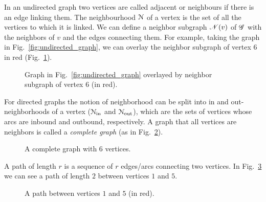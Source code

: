 \documentclass[../main.tex]{subfiles}
\begin{document}
In an undirected graph two vertices are called adjacent or neighbours if there is an edge linking them.
The neighbourhood $\mathcal{N}$ of a vertex is the set of all the vertices to which it is linked.
We can define a neighbor subgraph $\mathscr{N}(v)$ of $\mathscr{G}$ with the neighbors of $v$ and the edges connecting them. For example, taking the graph in Fig.~\ref{fig:undirected_graph}, we can overlay the neighbor subgraph of vertex $6$ in red (Fig.~\ref{fig:neighbor_subgraph}).


\begin{figure}[h]
  \centering
  \caption[Neighbor subgraph of vertex $6$ (in red).]{Graph in Fig.~\ref{fig:undirected_graph} overlayed by neighbor subgraph of vertex $6$ (in red).}\label{fig:neighbor_subgraph}
\end{figure}

For directed graphs the notion of neighborhood can be split into in and out-neighborhoods of a vertex ($\mathcal{N}_{\text{in}}$ and $\mathcal{N}_{\text{out}}$), which are the sets of vertices whose arcs are inbound and outbound, respectively.
A graph that all vertices are neighbors is called a \emph{complete graph} (as in Fig.~\ref{fig:complete_graph}).

\begin{figure}[h]
    \centering
    \caption{A complete graph with 6 vertices.}\label{fig:complete_graph}
\end{figure}

A path of length $r$ is a sequence of $r$ edges/arcs connecting two vertices. In Fig.~\ref{fig:a_path} we can see a path of length $2$ between vertices $1$ and $5$.

\begin{figure}[h]
  \centering
  \caption{A path between vertices $1$ and $5$ (in red).}\label{fig:a_path}
\end{figure}
\end{document}
